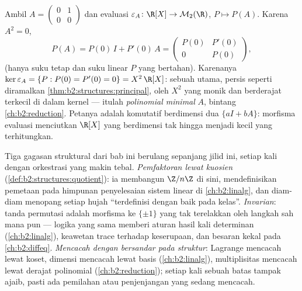 \begin{example}\label{ex:b2:structures:evaluation}
Ambil $A = \begin{pmatrix}0 & 1\\ 0 & 0\end{pmatrix}$ dan evaluasi
$\varepsilon_A \colon \R[X] \to \mathcal{M}_2(\R)$,
$P \mapsto P(A)$. Karena $A^2 = 0$,
\[
P(A) = P(0)\,I + P'(0)\,A =
\begin{pmatrix} P(0) & P'(0)\\ 0 & P(0)\end{pmatrix},
\]
(hanya suku tetap dan suku linear $P$ yang bertahan). Karenanya
$\ker\varepsilon_A = \{P : P(0) = P'(0) = 0\} = X^2\,\R[X]$: sebuah
 utama, persis seperti diramalkan
\cref{thm:b2:structures:principal},  oleh $X^2$ yang monik
dan berderajat terkecil di dalam kernel --- itulah \emph{polinomial
minimal} $A$, bintang \cref{ch:b2:reduction}. Petanya adalah 
komutatif berdimensi dua $\{aI + bA\}$: morfisma evaluasi menciutkan
$\R[X]$ yang berdimensi tak hingga menjadi  kecil yang terhitungkan.
\end{example}

\begin{remark}\label{rem:b2:structures:perspectives}
Tiga gagasan struktural dari bab ini berulang sepanjang jilid ini,
setiap kali dengan orkestrasi yang makin tebal. \emph{Pemfaktoran
lewat kuosien} (\cref{def:b2:structures:quotient}): ia membangun
$\Z/n\Z$ di sini, mendefinisikan pemetaan pada himpunan penyelesaian
sistem linear di \cref{ch:b2:linalg}, dan diam-diam menopang setiap
hujah ``terdefinisi dengan baik pada kelas''. \emph{Invarian}: tanda
permutasi adalah morfisma ke $\{\pm1\}$ yang tak terelakkan oleh
langkah sah mana pun --- logika yang sama memberi aturan hasil kali
determinan (\cref{ch:b2:linalg}), keawetan trace terhadap keserupaan,
dan besaran kekal pada \cref{ch:b2:diffeq}.
\emph{Mencacah dengan bersandar pada struktur}: Lagrange mencacah lewat
koset, dimensi mencacah lewat basis
(\cref{ch:b2:linalg}), multiplisitas mencacah lewat derajat polinomial
(\cref{ch:b2:reduction}); setiap kali sebuah batas tampak ajaib, pasti
ada pemilahan atau penjenjangan yang sedang mencacah.
\end{remark}


